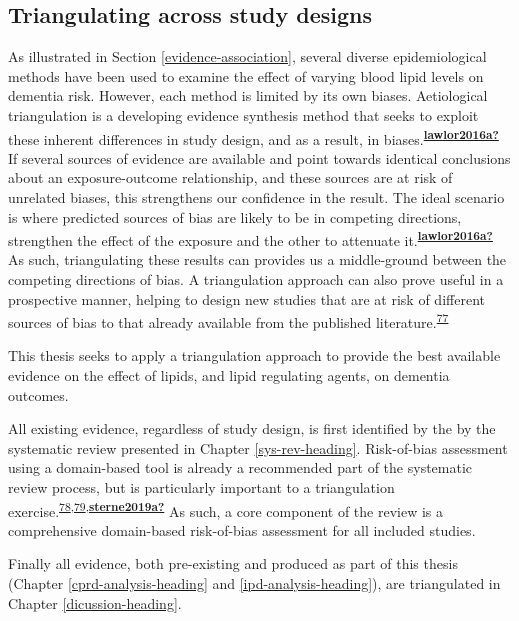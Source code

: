 \documentclass[a4paper, twoside]{templates/ociamthesis}
\begin{document}
\hypertarget{intro-triangulation}{%
\subsection{Triangulating across study designs}\label{intro-triangulation}}

As illustrated in Section \ref{evidence-association}, several diverse epidemiological methods have been used to examine the effect of varying blood lipid levels on dementia risk. However, each method is limited by its own biases. Aetiological triangulation is a developing evidence synthesis method that seeks to exploit these inherent differences in study design, and as a result, in biases.\textsuperscript{\protect\hyperlink{ref-lawlor2016a}{\textbf{lawlor2016a?}}} If several sources of evidence are available and point towards identical conclusions about an exposure-outcome relationship, and these sources are at risk of unrelated biases, this strengthens our confidence in the result. The ideal scenario is where predicted sources of bias are likely to be in competing directions, strengthen the effect of the exposure and the other to attenuate it.\textsuperscript{\protect\hyperlink{ref-lawlor2016a}{\textbf{lawlor2016a?}}} As such, triangulating these results can provides us a middle-ground between the competing directions of bias. A triangulation approach can also prove useful in a prospective manner, helping to design new studies that are at risk of different sources of bias to that already available from the published literature.\textsuperscript{\protect\hyperlink{ref-munafo2018}{77}}

This thesis seeks to apply a triangulation approach to provide the best available evidence on the effect of lipids, and lipid regulating agents, on dementia outcomes.

All existing evidence, regardless of study design, is first identified by the by the systematic review presented in Chapter \ref{sys-rev-heading}. Risk-of-bias assessment using a domain-based tool is already a recommended part of the systematic review process, but is particularly important to a triangulation exercise.\textsuperscript{\protect\hyperlink{ref-page2021}{78},\protect\hyperlink{ref-mcguinness2018}{79},\protect\hyperlink{ref-sterne2019a}{\textbf{sterne2019a?}}} As such, a core component of the review is a comprehensive domain-based risk-of-bias assessment for all included studies.

Finally all evidence, both pre-existing and produced as part of this thesis (Chapter \ref{cprd-analysis-heading} and \ref{ipd-analysis-heading}), are triangulated in Chapter \ref{dicussion-heading}.
\end{document}
